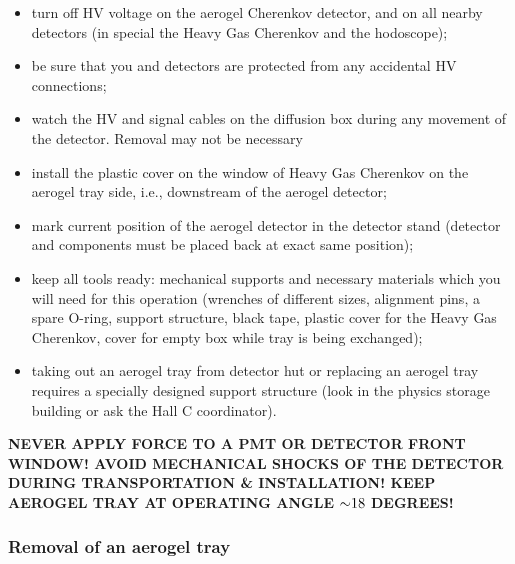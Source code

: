 {\begin{itemize}
  \item turn off HV voltage on the aerogel Cherenkov detector, and on
    all nearby detectors (in special the Heavy Gas Cherenkov and the
    hodoscope);
  \item be sure that you and detectors are protected from any
    accidental HV connections;
  \item watch the HV and signal cables on the diffusion box during any
    movement of the detector. Removal may not be necessary
  \item install the plastic cover on the window of Heavy Gas Cherenkov on the
    aerogel tray side, i.e., downstream of the aerogel detector;
  \item mark current position of the aerogel detector in the detector
    stand (detector and components must be placed back at exact same
    position);
  \item keep all tools ready: mechanical supports and necessary
    materials which you will need for this operation (wrenches of
    different sizes, alignment pins, a spare O-ring, support
    structure, black tape, plastic cover for the Heavy Gas Cherenkov,
    cover for empty box while tray is being exchanged);
  \item taking out an aerogel tray from detector hut or replacing an
    aerogel tray requires a specially designed support structure (look
    in the physics storage building or ask the Hall C coordinator).
    \end{itemize}

\textbf{NEVER APPLY FORCE TO A PMT OR DETECTOR
  FRONT WINDOW!  AVOID MECHANICAL SHOCKS OF THE DETECTOR DURING
  TRANSPORTATION \& INSTALLATION!  KEEP AEROGEL TRAY AT OPERATING ANGLE
  $\mathord{\sim} 18$ DEGREES!}

\subsubsection*{Removal of an aerogel tray}

}

